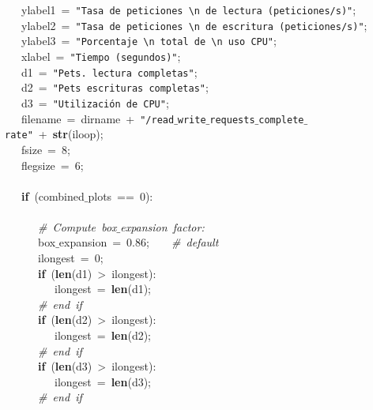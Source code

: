 \mbox{}\ \ \ ylabel1\ =\ \texttt{"{}Tasa\ de\ peticiones\ \textbackslash{}n\ de\ lectura\ (peticiones/s)"{}}; \\
\mbox{}\ \ \ ylabel2\ =\ \texttt{"{}Tasa\ de\ peticiones\ \textbackslash{}n\ de\ escritura\ (peticiones/s)"{}}; \\
\mbox{}\ \ \ ylabel3\ =\ \texttt{"{}Porcentaje\ \textbackslash{}n\ total\ de\ \textbackslash{}n\ uso\ CPU"{}}; \\
\mbox{}\ \ \ xlabel\ =\ \texttt{"{}Tiempo\ (segundos)"{}}; \\
\mbox{}\ \ \ d1\ =\ \texttt{"{}Pets.\ lectura\ completas"{}}; \\
\mbox{}\ \ \ d2\ =\ \texttt{"{}Pets\ escrituras\ completas"{}}; \\
\mbox{}\ \ \ d3\ =\ \texttt{"{}Utilización\ de\ CPU"{}}; \\
\mbox{}\ \ \ filename\ =\ dirname\ +\ \texttt{"{}/read$\_$write$\_$requests$\_$complete$\_$rate"{}}\ +\ \textbf{str}(iloop); \\
\mbox{}\ \ \ fsize\ =\ 8; \\
\mbox{}\ \ \ flegsize\ =\ 6; \\
\mbox{}\ \ \  \\
\mbox{}\ \ \ \textbf{if}\ (combined$\_$plots\ ==\ 0): \\
\mbox{}\ \ \ \ \ \  \\
\mbox{}\ \ \ \ \ \ \textit{\#\ Compute\ box$\_$expansion\ factor:} \\
\mbox{}\ \ \ \ \ \ box$\_$expansion\ =\ 0.86;\ \ \ \ \textit{\#\ default} \\
\mbox{}\ \ \ \ \ \ ilongest\ =\ 0; \\
\mbox{}\ \ \ \ \ \ \textbf{if}\ (\textbf{len}(d1)\ \textgreater{}\ ilongest): \\
\mbox{}\ \ \ \ \ \ \ \ \ ilongest\ =\ \textbf{len}(d1); \\
\mbox{}\ \ \ \ \ \ \textit{\#\ end\ if} \\
\mbox{}\ \ \ \ \ \ \textbf{if}\ (\textbf{len}(d2)\ \textgreater{}\ ilongest): \\
\mbox{}\ \ \ \ \ \ \ \ \ ilongest\ =\ \textbf{len}(d2); \\
\mbox{}\ \ \ \ \ \ \textit{\#\ end\ if} \\
\mbox{}\ \ \ \ \ \ \textbf{if}\ (\textbf{len}(d3)\ \textgreater{}\ ilongest): \\
\mbox{}\ \ \ \ \ \ \ \ \ ilongest\ =\ \textbf{len}(d3); \\
\mbox{}\ \ \ \ \ \ \textit{\#\ end\ if} \\
